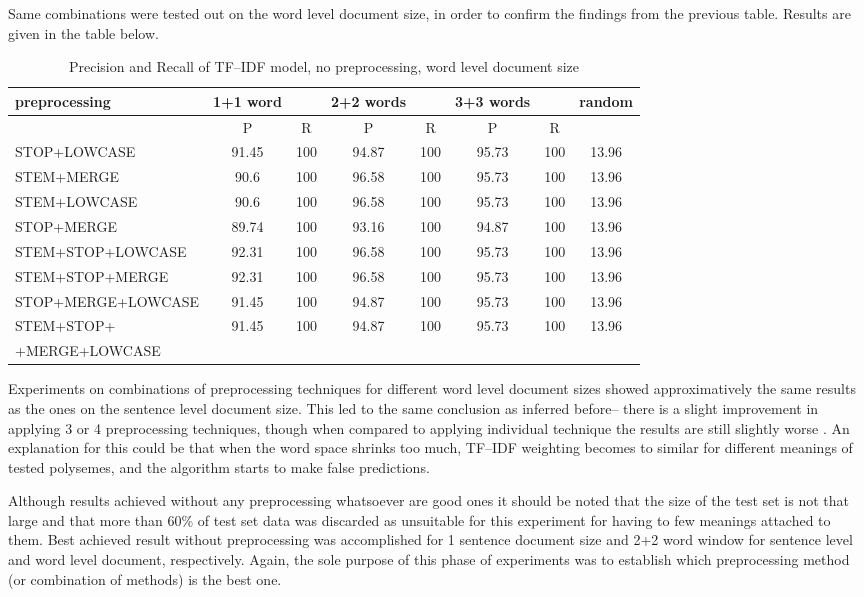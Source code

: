 Same combinations were tested out on the word level document size, in order to confirm the findings from the previous table. Results are given in the table below. 
\begin{table}[h!]
\begin{footnotesize}
\begin{tabular}{ l | c c | c c | c c | c}
   preprocessing & 1+1 word && 2+2 words && 3+3 words  && random\\
\hline\hline
	& P  &  R & P  &  R & P  &  R &\\
\hline
STOP+LOWCASE  & 91.45 & 100 & 94.87 & 100 & 95.73 & 100 & 13.96 \\
STEM+MERGE  & 90.6 & 100 & 96.58 & 100 & 95.73 & 100 & 13.96 \\
STEM+LOWCASE  & 90.6 & 100 & 96.58 & 100 & 95.73 & 100  & 13.96   \\
STOP+MERGE  & 89.74 & 100 & 93.16 & 100 & 94.87 & 100 & 13.96 \\
STEM+STOP+LOWCASE  & 92.31 & 100 & 96.58 & 100 & 95.73 & 100 & 13.96\\
STEM+STOP+MERGE  & 92.31 & 100 & 96.58 & 100 & 95.73 & 100 & 13.96 \\
STOP+MERGE+LOWCASE  & 91.45 & 100 & 94.87 & 100 & 95.73 & 100 & 13.96 \\
STEM+STOP+  & 91.45 & 100 & 94.87 & 100 & 95.73 & 100 & 13.96 \\
+MERGE+LOWCASE  &&&&&&&\\
\end{tabular}
\caption{Precision and Recall of TF--IDF model, no preprocessing, word level document size}
\end{footnotesize}
\end{table}

Experiments on combinations of preprocessing techniques for different word level document sizes showed approximatively the same results as the ones on the sentence level document size. This led to the same 
conclusion as inferred before-- there is a slight improvement in applying 3 or 4 preprocessing techniques, though when compared to applying individual technique the results are still slightly worse . An explanation for this could be that when the word space shrinks too much, TF--IDF weighting becomes to similar for different meanings of tested polysemes, and the algorithm starts to make false predictions.   


Although results achieved without any preprocessing whatsoever are good ones it should be noted that the size of the test set is not that large and that more than 60\% of test set data was 
discarded as unsuitable for this experiment for having to few meanings attached to them. Best achieved result without preprocessing was 
accomplished for 1 sentence document size and 2+2 word window for sentence level and word level document, respectively. Again, the sole purpose of this phase of experiments was to establish which preprocessing method (or combination of methods) is the best one.  

